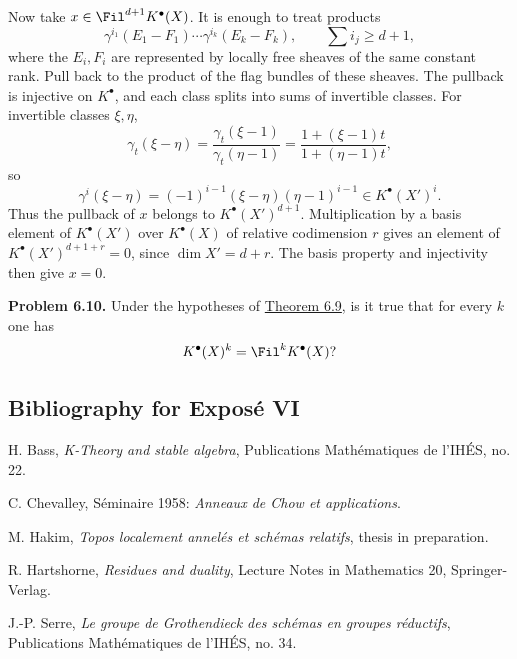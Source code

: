 Now take \(x\in \Fil^{d+1}K^\bullet(X)\). It is enough to treat products
\[
  \gamma^{i_1}(E_1-F_1)\cdots\gamma^{i_k}(E_k-F_k),
  \qquad \sum i_j\geq d+1,
\]
where the \(E_i,F_i\) are represented by locally free sheaves of the same constant rank. Pull back to the product of the flag bundles of these sheaves. The pullback is injective on \(K^\bullet\), and each class splits into sums of invertible classes. For invertible classes \(\xi,\eta\),
\[
  \gamma_t(\xi-\eta)
  =\frac{\gamma_t(\xi-1)}{\gamma_t(\eta-1)}
  =\frac{1+(\xi-1)t}{1+(\eta-1)t},
\]
so
\[
  \gamma^i(\xi-\eta)=(-1)^{i-1}(\xi-\eta)(\eta-1)^{i-1}\in K^\bullet(X')^i.
\]
Thus the pullback of \(x\) belongs to \(K^\bullet(X')^{d+1}\). Multiplication by a basis element of \(K^\bullet(X')\) over \(K^\bullet(X)\) of relative codimension \(r\) gives an element of \(K^\bullet(X')^{d+1+r}=0\), since \(\dim X'=d+r\). The basis property and injectivity then give \(x=0\).

\textbf{Problem 6.10.} Under the hypotheses of \hyperlink{sga6.e06.thm.6-9}{Theorem 6.9}, is it true that for every \(k\) one has
\[
  K^\bullet(X)^k=\Fil^kK^\bullet(X)?
\]

\subsection*{Bibliography for Exposé VI}
\begin{enumerate}[label={\textup{[\arabic*]}}]
\item H. Bass, \emph{K-Theory and stable algebra}, Publications Mathématiques de l'IHÉS, no. 22.
\item C. Chevalley, Séminaire 1958: \emph{Anneaux de Chow et applications}.
\item M. Hakim, \emph{Topos localement annelés et schémas relatifs}, thesis in preparation.
\item R. Hartshorne, \emph{Residues and duality}, Lecture Notes in Mathematics 20, Springer-Verlag.
\item J.-P. Serre, \emph{Le groupe de Grothendieck des schémas en groupes réductifs}, Publications Mathématiques de l'IHÉS, no. 34.
\end{enumerate}



\providecommand{\Kosz}{\mathrm K}
\providecommand{\Proj}{\operatorname{Proj}}
\providecommand{\Sym}{\operatorname{Sym}}
\providecommand{\gr}{\operatorname{gr}}
\providecommand{\Tor}{\operatorname{Tor}}
\providecommand{\Spec}{\operatorname{Spec}}
\providecommand{\Imf}{\operatorname{Im}}
\providecommand{\Ker}{\operatorname{Ker}}
\providecommand{\Id}{\operatorname{Id}}
\providecommand{\rad}{\operatorname{rad}}
\providecommand{\cO}{\mathcal O}
\providecommand{\cS}{\mathcal S}
\providecommand{\cJ}{\mathcal J}
\providecommand{\cN}{\mathcal N}
\providecommand{\bfP}{\mathbf P}
\providecommand{\bfA}{\mathbf A}


